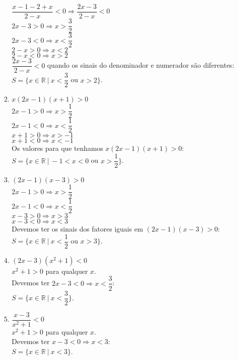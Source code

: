 \documentclass[10pt]{book}
\begin{document}
\begin{enumerate}
\begin{enumerate}
			$\dfrac{x - 1 - 2 + x}{2 - x} < 0 \Rightarrow \dfrac{2x - 3}{2 - x} < 0$\\[6pt]
			$2x - 3 > 0 \Rightarrow x > \dfrac{3}{2}$\\[6pt]
			$2x - 3 < 0 \Rightarrow x < \dfrac{3}{2}$\\[6pt]
			$2 - x > 0 \Rightarrow x < 2$\\
			$2 - x < 0 \Rightarrow x > 2$\\	
			$\dfrac{2x - 3}{2 - x} < 0$ quando os sinais do denominador e numerador são diferentes:\\[6pt]
			$S =  \lbrace x \in \mathbb{R} \ |\ x < \dfrac{3}{2}$ ou $x > 2\rbrace$.
			\addtocounter{enumii}{1}
			\item
			$x(2x - 1)(x + 1) > 0$\\
			$2x - 1 > 0 \Rightarrow x > \dfrac{1}{2}$\\[6pt]
			$2x - 1 < 0 \Rightarrow x < \dfrac{1}{2}$\\[6pt]
			$x + 1 > 0 \Rightarrow x > -1$\\
			$x + 1 < 0 \Rightarrow x < -1$\\
			Os valores para que tenhamos $x(2x - 1)(x + 1) > 0$:\\
			$S =  \lbrace x \in \mathbb{R} \ |\ -1 < x < 0$ ou $x > \dfrac{1}{2} \rbrace$.
			\item
			$(2x - 1)(x - 3) > 0$\\
			$2x - 1 > 0 \Rightarrow x > \dfrac{1}{2}$\\[6pt]
			$2x - 1 < 0 \Rightarrow x < \dfrac{1}{2}$\\[6pt]
			$x - 3 > 0 \Rightarrow x > 3$\\
			$x - 3 < 0 \Rightarrow x < 3$\\
			Devemos ter os sinais dos fatores iguais em 	$(2x - 1)(x - 3) > 0$: 
			$S =  \lbrace x \in \mathbb{R} \ |\ x < \dfrac{1}{2}$ ou $x > 3 \rbrace$.
			\item			
			$(2x - 3)(x^2 + 1) < 0$\\
			$x^2 + 1 > 0$ para qualquer $x$.\\
			Devemos ter $2x - 3 < 0 \Rightarrow x < \dfrac{3}{2}$:\\
			$S =  \lbrace x \in \mathbb{R} \ |\ x < \dfrac{3}{2} \rbrace$.
			\item
			$\dfrac{x - 3}{x^2 + 1} < 0$\\
			$x^2 + 1 > 0$ para qualquer $x$.\\
			Devemos ter $x - 3 < 0 \Rightarrow x < 3$:\\
			$S =  \lbrace x \in \mathbb{R} \ |\ x < 3 \rbrace$.

\end{enumerate}
\end{enumerate}
\end{document}
